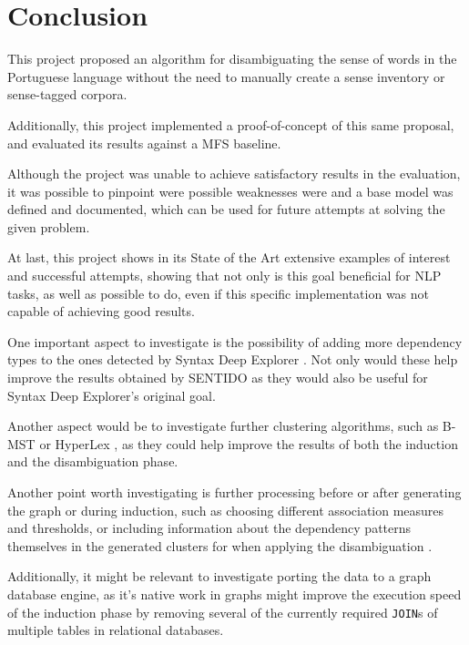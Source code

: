 \chapter{Conclusion}
\label{ch:conclusion}

This project proposed an algorithm for disambiguating the sense of words in the
Portuguese language without the need to manually create a sense inventory or
sense-tagged corpora.

Additionally, this project implemented a proof-of-concept of this same proposal,
and evaluated its results against a \ac{MFS} baseline.

Although the project was unable to achieve satisfactory results in the
evaluation, it was possible to pinpoint were possible weaknesses were and a base
model was defined and documented, which can be used for future attempts at
solving the given problem.

At last, this project shows in its State of the Art extensive examples of
interest and successful attempts, showing that not only is this goal beneficial
for \ac{NLP} tasks, as well as possible to do, even if this specific
implementation was not capable of achieving good results.

One important aspect to investigate is the possibility of adding more
dependency types to the ones detected by Syntax Deep Explorer
\citep{correia2015syntax}. Not only would these help improve the results
obtained
by \ac{SENTIDO} as they would also be useful for Syntax Deep Explorer's original
goal.

Another aspect would be to investigate further clustering algorithms, such as
\ac{B-MST} \citep{marco2013clustering} or HyperLex \citep{veronis2004hyperlex},
as
they could help improve the results of both the induction and the disambiguation
phase.

Another point worth investigating is further processing before or after
generating the graph or during induction, such as choosing different association
measures and thresholds, or including information about the dependency patterns
themselves in the generated clusters for when applying the disambiguation
\citep{panchenko2016noun}.

Additionally, it might be relevant to investigate porting the data to a graph
database engine, as it's native work in graphs might improve the execution speed
of the induction phase by removing several of the currently required
\texttt{JOIN}s of multiple tables in relational databases.

